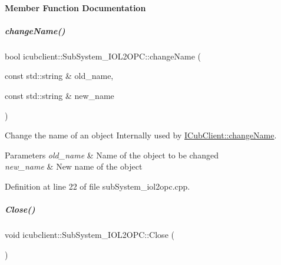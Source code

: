 \paragraph{Member Function Documentation}
\mbox{\label{group__icubclient__subsystems_a08ccd01433080f2dce96aea13cf6c898}} 
\subparagraph{\texorpdfstring{change\+Name()}{changeName()}}
{\footnotesize\ttfamily bool icubclient\+::\+Sub\+System\+\_\+\+I\+O\+L2\+O\+P\+C\+::change\+Name (\begin{DoxyParamCaption}\item[{const std\+::string \&}]{old\+\_\+name,  }\item[{const std\+::string \&}]{new\+\_\+name }\end{DoxyParamCaption})\hspace{0.3cm}{\ttfamily [protected]}}



Change the name of an object Internally used by \hyperlink{group__icubclient__clients_a860fb1399bafb125c3955110dc17a42e}{I\+Cub\+Client\+::change\+Name}. 


\begin{DoxyParams}{Parameters}
{\em old\+\_\+name} & Name of the object to be changed \\
\hline
{\em new\+\_\+name} & New name of the object \\
\hline
\end{DoxyParams}


Definition at line 22 of file sub\+System\+\_\+iol2opc.\+cpp.

\mbox{\label{group__icubclient__subsystems_a15246d09894da753d1672f58b6af8556}} 
\subparagraph{\texorpdfstring{Close()}{Close()}}
{\footnotesize\ttfamily void icubclient\+::\+Sub\+System\+\_\+\+I\+O\+L2\+O\+P\+C\+::\+Close (\begin{DoxyParamCaption}{ }\end{DoxyParamCaption})\hspace{0.3cm}{\ttfamily [virtual]}}



